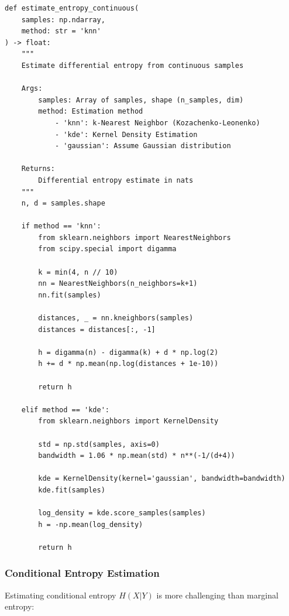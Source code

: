 \documentclass[10pt, letterpaper]{article}
\begin{document}
\begin{lstlisting}
def estimate_entropy_continuous(
    samples: np.ndarray,
    method: str = 'knn'
) -> float:
    """
    Estimate differential entropy from continuous samples

    Args:
        samples: Array of samples, shape (n_samples, dim)
        method: Estimation method
            - 'knn': k-Nearest Neighbor (Kozachenko-Leonenko)
            - 'kde': Kernel Density Estimation
            - 'gaussian': Assume Gaussian distribution

    Returns:
        Differential entropy estimate in nats
    """
    n, d = samples.shape

    if method == 'knn':
        from sklearn.neighbors import NearestNeighbors
        from scipy.special import digamma

        k = min(4, n // 10)
        nn = NearestNeighbors(n_neighbors=k+1)
        nn.fit(samples)

        distances, _ = nn.kneighbors(samples)
        distances = distances[:, -1]

        h = digamma(n) - digamma(k) + d * np.log(2)
        h += d * np.mean(np.log(distances + 1e-10))

        return h

    elif method == 'kde':
        from sklearn.neighbors import KernelDensity

        std = np.std(samples, axis=0)
        bandwidth = 1.06 * np.mean(std) * n**(-1/(d+4))

        kde = KernelDensity(kernel='gaussian', bandwidth=bandwidth)
        kde.fit(samples)

        log_density = kde.score_samples(samples)
        h = -np.mean(log_density)

        return h
\end{lstlisting}

\subsubsection{Conditional Entropy Estimation}

Estimating conditional entropy $H(X|Y)$ is more challenging than marginal entropy:
\end{document}
